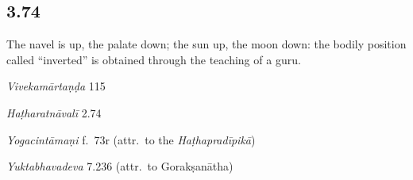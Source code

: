 \begin{ekdosis}



\subsection*{3.74}
\begin{translation}[hp03_074]
The navel is up, the palate down; the sun up, the moon down: the bodily position called “inverted” is obtained through the teaching of a guru.
\end{translation}
% 

\begin{sources}[hp03_074]
\emph{Vivekamārtaṇḍa} 115
\begin{versinnote}
\end{versinnote}
\end{sources}

\begin{testimonia}[hp03_074]
\emph{Haṭharatnāvalī} 2.74
\begin{versinnote}
\end{versinnote}

\emph{Yogacintāmaṇi} f.~73r (attr.~to the \emph{Haṭhapradīpikā})
\begin{versinnote}
\end{versinnote}

\emph{Yuktabhavadeva} 7.236 (attr.~to Gorakṣanātha)
\begin{versinnote}
\end{versinnote}
\end{testimonia}


\end{ekdosis}
